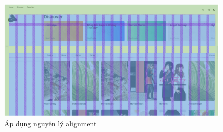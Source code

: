 \documentclass[./../main.tex]{subfiles}
\begin{document}
\begin{figure}[H]
	\centering
	\includegraphics[width=\linewidth]{./images/image9.png}
	\caption{Áp dụng nguyên lý alignment}
\end{figure}
\end{document}
